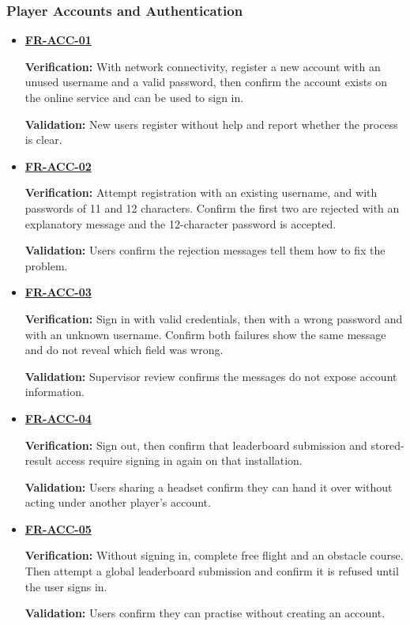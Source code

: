 \documentclass[12pt]{article}
\begin{document}
\subsubsection{Player Accounts and Authentication}
\begin{itemize}
\item \hyperlink{req:FR-ACC-01}{\textbf{FR-ACC-01}}\par
 \textbf{Verification:} With network connectivity, register a new account with
 an unused username and a valid password, then confirm the account exists on
 the online service and can be used to sign in.\par
 \textbf{Validation:} New users register without help and report whether the
 process is clear.
\item \hyperlink{req:FR-ACC-02}{\textbf{FR-ACC-02}}\par
 \textbf{Verification:} Attempt registration with an existing username, and
 with passwords of 11 and 12 characters. Confirm the first two are rejected
 with an explanatory message and the 12-character password is accepted.\par
 \textbf{Validation:} Users confirm the rejection messages tell them how to fix
 the problem.
\item \hyperlink{req:FR-ACC-03}{\textbf{FR-ACC-03}}\par
 \textbf{Verification:} Sign in with valid credentials, then with a wrong
 password and with an unknown username. Confirm both failures show the same
 message and do not reveal which field was wrong.\par
 \textbf{Validation:} Supervisor review confirms the messages do not expose
 account information.
\item \hyperlink{req:FR-ACC-04}{\textbf{FR-ACC-04}}\par
 \textbf{Verification:} Sign out, then confirm that leaderboard submission and
 stored-result access require signing in again on that installation.\par
 \textbf{Validation:} Users sharing a headset confirm they can hand it over
 without acting under another player's account.
\item \hyperlink{req:FR-ACC-05}{\textbf{FR-ACC-05}}\par
 \textbf{Verification:} Without signing in, complete free flight and an
 obstacle course. Then attempt a global leaderboard submission and confirm it
 is refused until the user signs in.\par
 \textbf{Validation:} Users confirm they can practise without creating an
 account.
\end{itemize}
\end{document}
